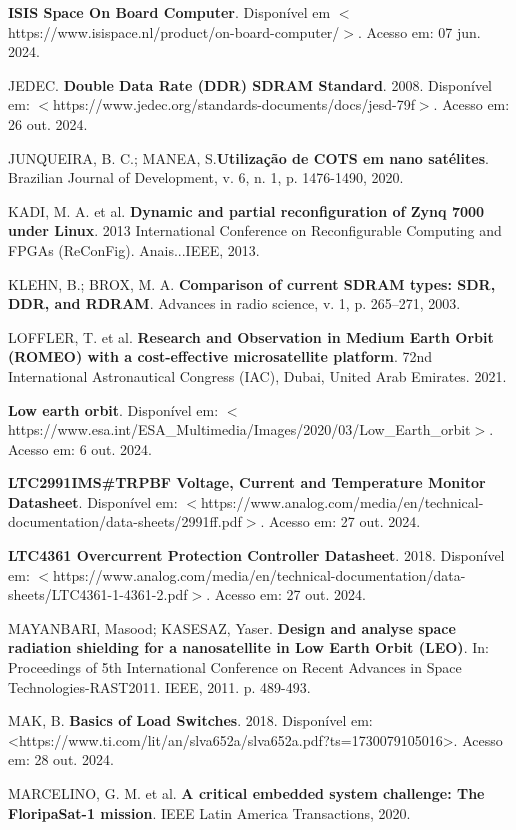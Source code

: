 \begin{flushleft}
\begin{thebibliography}{00}
 \textbf{ISIS Space On Board Computer}. Disponível em $<$https://www.isispace.nl/product/on-board-computer/$>$. Acesso em: 07 jun. 2024.

 JEDEC. \textbf{Double Data Rate (DDR) SDRAM Standard}. 2008. Disponível em: $<$https://www.jedec.org/standards-documents/docs/jesd-79f$>$. Acesso em: 26 out. 2024.

 JUNQUEIRA, B. C.; MANEA, S.\textbf{Utilização de COTS em nano satélites}. Brazilian Journal of Development, v. 6, n. 1, p. 1476-1490, 2020.

 KADI, M. A. et al. \textbf{Dynamic and partial reconfiguration of Zynq 7000 under Linux}. 2013 International Conference on Reconfigurable Computing and FPGAs (ReConFig). Anais...IEEE, 2013.

 KLEHN, B.; BROX, M. A. \textbf{Comparison of current SDRAM types: SDR, DDR, and RDRAM}. Advances in radio science, v. 1, p. 265–271, 2003.

 LOFFLER, T. et al. \textbf{Research and Observation in Medium Earth Orbit (ROMEO) with a cost-effective microsatellite platform}. 72nd International Astronautical Congress (IAC), Dubai, United Arab Emirates. 2021. 

 \textbf{Low earth orbit}. Disponível em: $<$https://www.esa.int/ESA\_Multimedia/Images/2020/03/Low\_Earth\_orbit$>$. Acesso em: 6 out. 2024.

 \textbf{LTC2991IMS\#TRPBF Voltage, Current and Temperature Monitor Datasheet}. Disponível em: $<$https://www.analog.com/media/en/technical-documentation/data-sheets/2991ff.pdf$>$. Acesso em: 27 out. 2024. 

 \textbf{LTC4361 Overcurrent Protection Controller Datasheet}. 2018. Disponível em: $<$https://www.analog.com/media/en/technical-documentation/data-sheets/LTC4361-1-4361-2.pdf$>$. Acesso em: 27 out. 2024. 

 MAYANBARI, Masood; KASESAZ, Yaser. \textbf{Design and analyse space radiation shielding for a nanosatellite in Low Earth Orbit (LEO)}. In: Proceedings of 5th International Conference on Recent Advances in Space Technologies-RAST2011. IEEE, 2011. p. 489-493.

 MAK, B. \textbf{Basics of Load Switches}. 2018. Disponível em: <https://www.ti.com/lit/an/slva652a/slva652a.pdf?ts=1730079105016>. Acesso em: 28 out. 2024.

 MARCELINO, G. M. et al. \textbf{A critical embedded system challenge: The FloripaSat-1 mission}. IEEE Latin America Transactions, 2020.


\end{thebibliography}
\end{flushleft}
